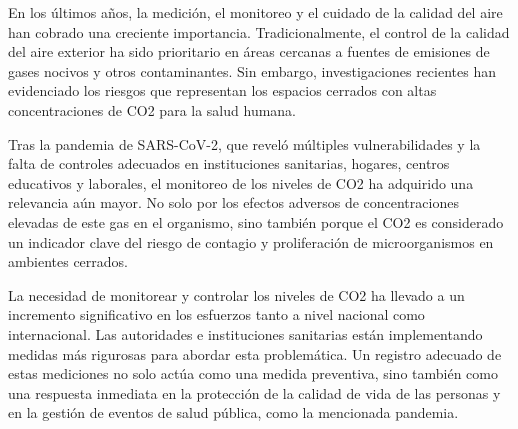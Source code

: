 

En los últimos años, la medición, el monitoreo y el cuidado de la calidad del aire han cobrado una creciente importancia. Tradicionalmente, el control de la calidad del aire exterior ha sido prioritario en áreas cercanas a fuentes de emisiones de gases nocivos y otros contaminantes. Sin embargo, investigaciones recientes han evidenciado los riesgos que representan los espacios cerrados con altas concentraciones de CO2 para la salud humana.

Tras la pandemia de SARS-CoV-2, que reveló múltiples vulnerabilidades y la falta de controles adecuados en instituciones sanitarias, hogares, centros educativos y laborales, el monitoreo de los niveles de CO2 ha adquirido una relevancia aún mayor. No solo por los efectos adversos de concentraciones elevadas de este gas en el organismo, sino también porque el CO2 es considerado un indicador clave del riesgo de contagio y proliferación de microorganismos en ambientes cerrados.

La necesidad de monitorear y controlar los niveles de CO2 ha llevado a un incremento significativo en los esfuerzos tanto a nivel nacional como internacional. Las autoridades e instituciones sanitarias están implementando medidas más rigurosas para abordar esta problemática. Un registro adecuado de estas mediciones no solo actúa como una medida preventiva, sino también como una respuesta inmediata en la protección de la calidad de vida de las personas y en la gestión de eventos de salud pública, como la mencionada pandemia.

